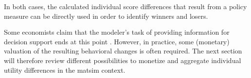 %
In both cases, the calculated individual score differences that result from a policy measure can be directly used in order to identify winners and losers.
%

Some economists claim that the modeler's task of providing information for decision support ends at this point \citep{AhlheimRose1989MessungIndividuellerWohlfahrt}. However, in practice, some (monetary) valuation of the resulting behavioral changes is often required. The next section will therefore review different possibilities to monetize and aggregate individual utility differences in the \acrshort{matsim} context.

